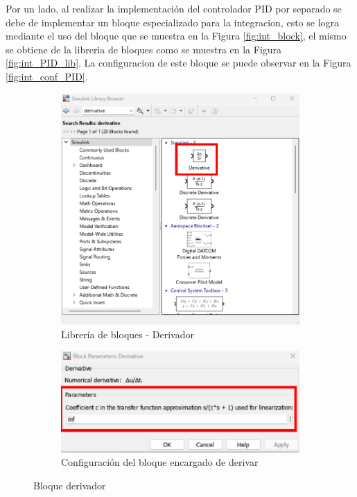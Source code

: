 Por un lado, al realizar la implementación del controlador PID por separado se debe de implementar un bloque especializado para la integracion, esto se logra mediante el uso del bloque que se muestra en la Figura \ref{fig:int_block}, el mismo se obtiene de la libreria de bloques como se muestra en la Figura \ref{fig:int_PID_lib}. La configuracion de este bloque se puede observar en la Figura \ref{fig:int_conf_PID}. 
\begin{figure}[htbp]
    \centering
    \begin{subfigure}[b]{0.35\textwidth}
        \centering
        \includegraphics[width=\textwidth]{fig/Capitulo5/Caso_de_estudio_PID/lib_derivative.pdf}
        \caption{Librería de bloques - Derivador}
        \label{fig:dev_PID_lib}
    \end{subfigure}
    \hfill
    \begin{subfigure}[b]{0.45\textwidth}
        \centering
        \includegraphics[width=\textwidth]{fig/Capitulo5/Caso_de_estudio_PID/config_derivative.pdf}
        \caption{Configuración del bloque encargado de derivar}
        \label{fig:dev_PID_conf}
    \end{subfigure}
    \caption{Bloque derivador}
    \label{fig:dev_block}
\end{figure}

